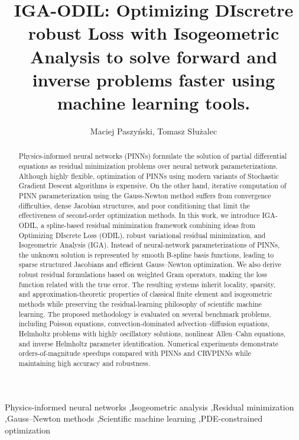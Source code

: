 \documentclass[review]{elsarticle}
\begin{document}
\begin{frontmatter}

\title{IGA-ODIL: Optimizing DIscretre robust Loss with Isogeometric Analysis to solve forward and inverse problems faster using machine learning tools.}

\author{Maciej Paszy\'nski, Tomasz S\l{}u\.zalec}
\address{Faculty of Computer Science, AGH University of Krakow, Poland}

\begin{abstract}
Physics-informed neural networks (PINNs) formulate the solution of partial differential equations as residual minimization problems over neural network parameterizations. Although highly flexible, optimization of PINNs using modern variants of Stochastic Gradient Descent algorithms is expensive. On the other hand, iterative computation of PINN parameterization using the Gauss-Newton method suffers from convergence  difficulties, dense Jacobian structures, and poor conditioning that limit the effectiveness of second-order optimization methods. In this work, we introduce IGA-ODIL, a spline-based residual minimization framework combining ideas from Optimizing DIscrete Loss (ODIL), robust variational residual minimization, and Isogeometric Analysis (IGA). Instead of neural-network parameterizations of PINNs, the unknown solution is represented by smooth B-spline basis functions, leading to sparse structured Jacobians and efficient Gauss--Newton optimization.
We also derive robust residual formulations based on weighted Gram operators, making the loss function related with the true error. 
The resulting systems inherit locality, sparsity, and approximation-theoretic properties of classical finite element and isogeometric methods while preserving the residual-learning philosophy of scientific machine learning.
The proposed methodology is evaluated on several benchmark problems, including Poisson equations, convection-dominated advection--diffusion equations, Helmholtz problems with highly oscillatory solutions, nonlinear Allen--Cahn equations, and inverse Helmholtz parameter identification. Numerical experiments demonstrate orders-of-magnitude speedups compared with PINNs and CRVPINNs while maintaining high accuracy and robustness.
\end{abstract}

\begin{keyword}
Physics-informed neural networks \sep Isogeometric analysis \sep Residual minimization \sep Gauss--Newton methods \sep Scientific machine learning \sep PDE-constrained optimization
\end{keyword}

\end{frontmatter}
\end{document}
